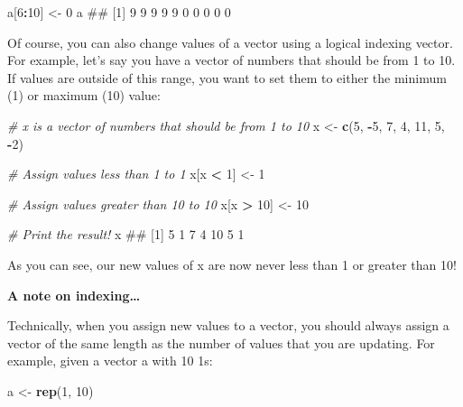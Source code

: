 \documentclass[]{book}
\newenvironment{Shaded}{\begin{snugshade}}{\end{snugshade}}
\newcommand{\KeywordTok}[1]{\textcolor[rgb]{0.13,0.29,0.53}{\textbf{#1}}}
\newcommand{\DecValTok}[1]{\textcolor[rgb]{0.00,0.00,0.81}{#1}}
\newcommand{\StringTok}[1]{\textcolor[rgb]{0.31,0.60,0.02}{#1}}
\newcommand{\CommentTok}[1]{\textcolor[rgb]{0.56,0.35,0.01}{\textit{#1}}}
\newcommand{\OperatorTok}[1]{\textcolor[rgb]{0.81,0.36,0.00}{\textbf{#1}}}
\newcommand{\NormalTok}[1]{#1}
\theoremstyle{definition}
\theoremstyle{definition}
\theoremstyle{remark}
\begin{document}
\begin{Shaded}
\begin{Highlighting}[]
\NormalTok{a[}\DecValTok{6}\OperatorTok{:}\DecValTok{10}\NormalTok{] <-}\StringTok{ }\DecValTok{0}
\NormalTok{a}
\NormalTok{##  [1] 9 9 9 9 9 0 0 0 0 0}
\end{Highlighting}
\end{Shaded}

Of course, you can also change values of a vector using a logical
indexing vector. For example, let's say you have a vector of numbers
that should be from 1 to 10. If values are outside of this range, you
want to set them to either the minimum (1) or maximum (10) value:

\begin{Shaded}
\begin{Highlighting}[]
\CommentTok{# x is a vector of numbers that should be from 1 to 10}
\NormalTok{x <-}\StringTok{ }\KeywordTok{c}\NormalTok{(}\DecValTok{5}\NormalTok{, }\OperatorTok{-}\DecValTok{5}\NormalTok{, }\DecValTok{7}\NormalTok{, }\DecValTok{4}\NormalTok{, }\DecValTok{11}\NormalTok{, }\DecValTok{5}\NormalTok{, }\OperatorTok{-}\DecValTok{2}\NormalTok{)}

\CommentTok{# Assign values less than 1 to 1}
\NormalTok{x[x }\OperatorTok{<}\StringTok{ }\DecValTok{1}\NormalTok{] <-}\StringTok{ }\DecValTok{1}

\CommentTok{# Assign values greater than 10 to 10}
\NormalTok{x[x }\OperatorTok{>}\StringTok{ }\DecValTok{10}\NormalTok{] <-}\StringTok{ }\DecValTok{10}

\CommentTok{# Print the result!}
\NormalTok{x}
\NormalTok{## [1]  5  1  7  4 10  5  1}
\end{Highlighting}
\end{Shaded}

As you can see, our new values of x are now never less than 1 or greater
than 10!

\textbf{A note on indexing\ldots{}}

Technically, when you assign new values to a vector, you should always
assign a vector of the same length as the number of values that you are
updating. For example, given a vector a with 10 1s:

\begin{Shaded}
\begin{Highlighting}[]
\NormalTok{a <-}\StringTok{ }\KeywordTok{rep}\NormalTok{(}\DecValTok{1}\NormalTok{, }\DecValTok{10}\NormalTok{)}
\end{Highlighting}
\end{Shaded}
\end{document}
